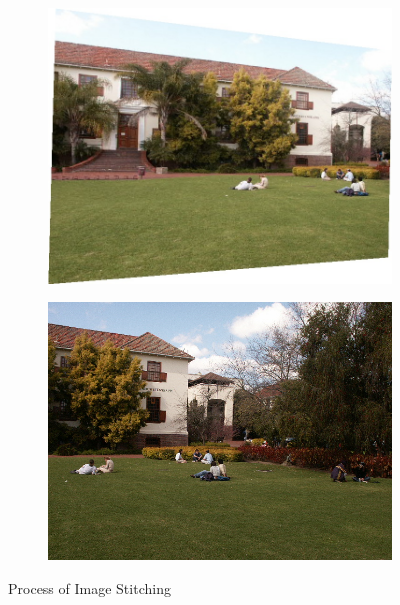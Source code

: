 \documentclass{article}
\begin{document}
\begin{figure}[H]
    \centering
    \begin{subfigure}{.3\textwidth}
        \centering
        \includegraphics[width=\textwidth]{q4/output/transformed.jpg}
    \end{subfigure}
    \begin{subfigure}{.3\textwidth}
        \centering
        \includegraphics[width=\textwidth]{q4/perold2.jpg}
        \label{fig 1}
    \end{subfigure}
    \caption{Process of Image Stitching}
\end{figure}
\end{document}
